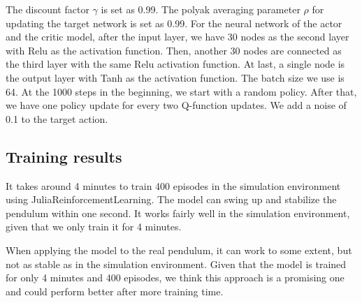 \documentclass{LTHtwocol} %
\begin{document}
The discount factor $\gamma$ is set as 0.99. The polyak averaging parameter $\rho$ for updating the target network is set as 0.99. 
For the neural network of the actor and the critic model, after the input layer, we have 30 nodes as the second layer with Relu as the activation function. Then, another 30 nodes are connected as the third layer with the same Relu activation function. At last, a single node is the output layer with Tanh as the activation function. The batch size we use is 64. At the 1000 steps in the beginning, we start with a random policy. After that, we have one policy update for every two Q-function updates. We add a noise of 0.1 to the target action.

\subsection{Training results}
It takes around 4 minutes to train 400 episodes in the simulation environment using JuliaReinforcementLearning\cite{Tian2020Reinforcement}. The model can swing up and stabilize the pendulum within one second. It works fairly well in the simulation environment, given that we only train it for 4 minutes. 

When applying the model to the real pendulum, it can work to some extent, but not as stable as in the simulation environment. Given that the model is trained for only 4 minutes and 400 episodes, we think this approach is a promising one and could perform better after more training time.
\end{document}
